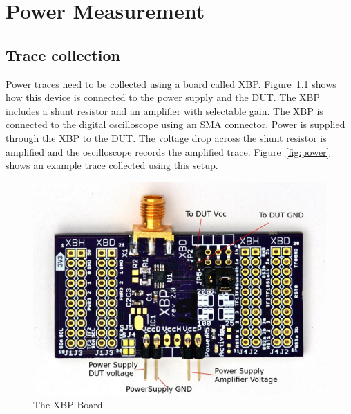 \chapter{Power Measurement}
\section{Trace collection}

Power traces need to be collected using a board called XBP. Figure~\ref{fig:xbp} shows how this device is connected to
the power supply and the DUT. The XBP includes a shunt resistor and an amplifier with selectable gain.
The XBP is connected to the digital oscilloscope using an SMA connector.
Power is supplied through the XBP to the DUT. The voltage drop across the shunt resistor is amplified and the oscilloscope records the amplified trace.
Figure~\ref{fig:power} shows an example trace collected using this setup. 


\begin{figure} 
   \begin{center}
   \includegraphics[scale=1]{../figures/xbp-no-xbh-labeled}
   \caption{\label{fig:xbp}The XBP Board}
   \end{center}
  
\end{figure}


